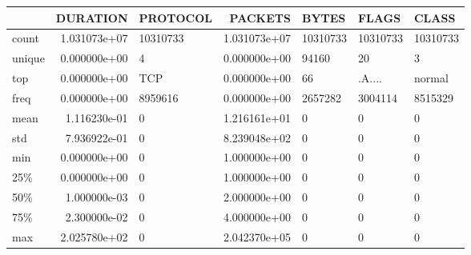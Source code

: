 \begin{tabular}{lrlrlll}
\toprule
{} &      DURATION &  PROTOCOL &       PACKETS &     BYTES &     FLAGS &     CLASS \\
\midrule
count  &  1.031073e+07 &  10310733 &  1.031073e+07 &  10310733 &  10310733 &  10310733 \\
unique &  0.000000e+00 &         4 &  0.000000e+00 &     94160 &        20 &         3 \\
top    &  0.000000e+00 &     TCP   &  0.000000e+00 &        66 &    .A.... &    normal \\
freq   &  0.000000e+00 &   8959616 &  0.000000e+00 &   2657282 &   3004114 &   8515329 \\
mean   &  1.116230e-01 &         0 &  1.216161e+01 &         0 &         0 &         0 \\
std    &  7.936922e-01 &         0 &  8.239048e+02 &         0 &         0 &         0 \\
min    &  0.000000e+00 &         0 &  1.000000e+00 &         0 &         0 &         0 \\
25\%    &  0.000000e+00 &         0 &  1.000000e+00 &         0 &         0 &         0 \\
50\%    &  1.000000e-03 &         0 &  2.000000e+00 &         0 &         0 &         0 \\
75\%    &  2.300000e-02 &         0 &  4.000000e+00 &         0 &         0 &         0 \\
max    &  2.025780e+02 &         0 &  2.042370e+05 &         0 &         0 &         0 \\
\bottomrule
\end{tabular}
